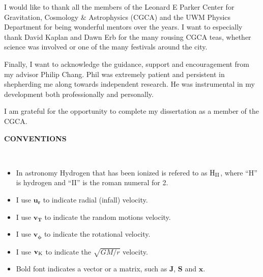 \documentclass[12pt,notitlepage]{report}
\newcommand{\dblspc}{\setstretch{1.6}}
\newcommand{\ur}{\mathbf{u_r}}
\newcommand{\vt}{\mathbf{v_T}}
\newcommand{\vkep}{\mathbf{v_{\rm K}}}
\newcommand{\vphi}{\mathbf{v_\phi}}
\newcommand{\HII}{{\rm H}_{\rm II}}
\begin{document}
I would like to thank all the members of the Leonard E Parker Center for Gravitation, Cosmology \& Astrophysics (CGCA) and the UWM Physics Department 
for being wonderful mentors over the years. 
I want to especially thank David Kaplan and Dawn Erb for the many rousing CGCA teas, whether science was involved or one of the many festivals around the city. 

Finally, I want to acknowledge the guidance, support and encouragement from my advisor Philip Chang. 
Phil was extremely patient and persistent in shepherding me along towards independent research. 
He was instrumental in my development both professionally and personally. 

I am grateful for the opportunity to complete my dissertation as a member of the CGCA.

\newpage

\begin{center}
{\Large \bf CONVENTIONS}
\end{center}
\ \\

\begin{itemize} 

\item In astronomy Hydrogen that has been ionized is refered to as $\HII$, where ``H'' is hydrogen and ``II'' is the roman numeral for 2. 

\item I use $\ur$ to indicate radial (infall) velocity.

\item I use $\vt$ to indicate the random motions velocity.

\item I use $\vphi$ to indicate the rotational velocity.

\item I use $\vkep$ to indicate the $\sqrt{GM/r}$ velocity.

\item Bold font indicates a vector or a matrix, such as $\mathbf{J}$, $\mathbf{S}$ and $\mathbf{x}$.

\end{itemize}

\dblspc %

\newpage

%
\pagestyle{uwmheadings}

\pagestyle{fancy} \lhead{} \chead{} \rhead{} \lfoot{} \cfoot{\thepage} \rfoot{}
\end{document}
